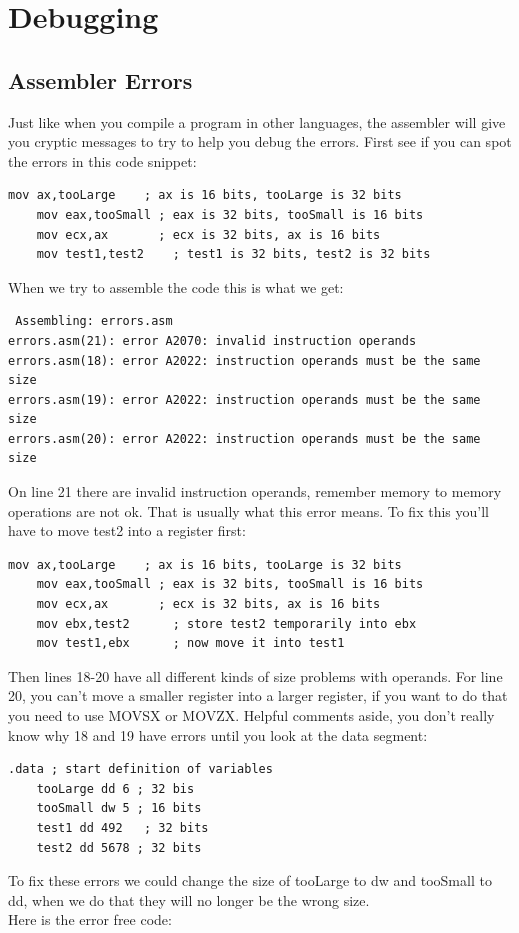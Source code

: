 \section{Debugging}
\subsection{Assembler Errors}
Just like when you compile a program in other languages, the assembler will give you cryptic messages to try to help you debug the errors.  First see if you can spot the errors in this code snippet:
\begin{lstlisting}[language={[x86masm]Assembler},firstnumber=18]
    mov ax,tooLarge    ; ax is 16 bits, tooLarge is 32 bits
    mov eax,tooSmall ; eax is 32 bits, tooSmall is 16 bits
    mov ecx,ax 	     ; ecx is 32 bits, ax is 16 bits
    mov test1,test2    ; test1 is 32 bits, test2 is 32 bits
\end{lstlisting}
When we try to assemble the code this is what we get:
\begin{verbatim}
 Assembling: errors.asm
errors.asm(21): error A2070: invalid instruction operands
errors.asm(18): error A2022: instruction operands must be the same size
errors.asm(19): error A2022: instruction operands must be the same size
errors.asm(20): error A2022: instruction operands must be the same size
\end{verbatim}
On line 21 there are invalid instruction operands, remember memory to memory operations are not ok.  That is usually what this error means.  To fix this you'll have to move test2 into a register first: 
\begin{lstlisting}[language={[x86masm]Assembler},firstnumber=18]
    mov ax,tooLarge    ; ax is 16 bits, tooLarge is 32 bits
    mov eax,tooSmall ; eax is 32 bits, tooSmall is 16 bits
    mov ecx,ax 	     ; ecx is 32 bits, ax is 16 bits
    mov ebx,test2      ; store test2 temporarily into ebx
    mov test1,ebx      ; now move it into test1
\end{lstlisting}
Then lines 18-20 have all different kinds of size problems with operands.  For line 20, you can't move a smaller register into a larger register, if you want to do that you need to use MOVSX or MOVZX.  Helpful comments aside, you don't really know why 18 and 19 have errors until you look at the data segment:
\begin{lstlisting}[language={[x86masm]Assembler},firstnumber=6]
.data ; start definition of variables
	tooLarge dd 6 ; 32 bis
	tooSmall dw 5 ; 16 bits
	test1 dd 492   ; 32 bits
	test2 dd 5678 ; 32 bits
\end{lstlisting}
To fix these errors we could change the size of tooLarge to dw and tooSmall to dd, when we do that they will no longer be the wrong size.  \\
Here is the error free code:

